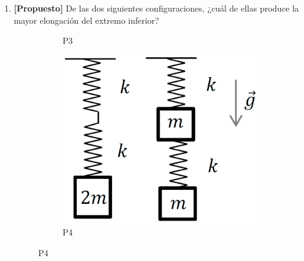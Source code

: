 \documentclass[letterpaper,11pt]{article}
\begin{document}
\begin{enumerate}
\item\textbf{[Propuesto]} De las dos siguientes configuraciones, ¿cuál de ellas produce la mayor elongación del extremo inferior?

\begin{figure}[H]
    \centering
    \begin{subfigure}[t]{0.45\textwidth}
        \centering
             
        \caption{P3}
    \end{subfigure}
    \begin{subfigure}[t]{0.45\textwidth}
        \centering
        \includegraphics[scale=0.2]{2021-2/img/aux6/resortes.png}
        \caption{P4}
    \end{subfigure}
\end{figure}

%   

\end{enumerate}
\end{document}
